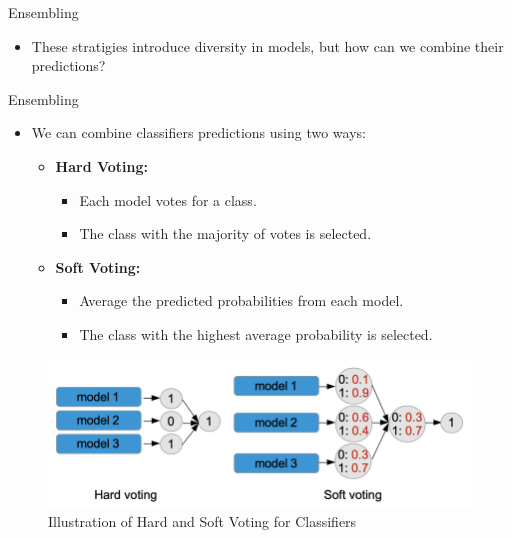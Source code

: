 \begin{frame}{Ensembling}
\begin{itemize}
\item These stratigies introduce diversity in models, but how can we combine their predictions?
\end{itemize}
\end{frame}

\begin{frame}{Ensembling}
\begin{itemize}
\item We can combine classifiers predictions using two ways:
\begin{itemize}
    \item \textbf{Hard Voting:}
    \begin{itemize}
        \item Each model votes for a class.
        \item The class with the majority of votes is selected.
    \end{itemize}
    \item \textbf{Soft Voting:}
    \begin{itemize}
        \item Average the predicted probabilities from each model.
        \item The class with the highest average probability is selected.
    \end{itemize}
\end{itemize}
\end{itemize}
\begin{figure}
    \centering
    \includegraphics[width=0.8\linewidth]{images/voting.png}
    \caption{Illustration of Hard and Soft Voting for Classifiers}
\end{figure}
\end{frame}

